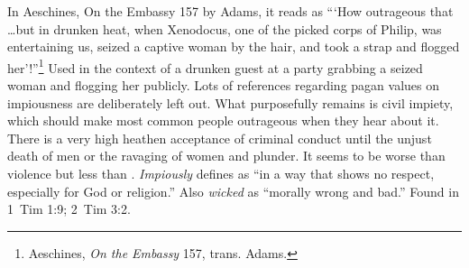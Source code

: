 In Aeschines, On the Embassy 157 by Adams, it reads as ```How outrageous that \ldots but in drunken heat, when Xenodocus, one of the picked corps of Philip, was entertaining us, seized a captive woman by the hair, and took a strap and flogged her'!''\footnote{Aeschines, \emph{On the Embassy} 157, trans. Adams.} Used in the context of a drunken guest at a party grabbing a seized woman and flogging her publicly.
Lots of references regarding pagan values on impiousness are deliberately left out. What purposefully remains is civil impiety, which should make most common people outrageous when they hear about it. There is a very high heathen acceptance of criminal conduct until the unjust death of men or the ravaging of women and plunder. It seems to be worse than  violence but less than .
 \emph{Impiously} defines as ``in a way that shows no respect, especially for God or religion.'' Also \emph{wicked} as ``morally wrong and bad.''
Found in 1~Tim 1:9; 2~Tim 3:2.
